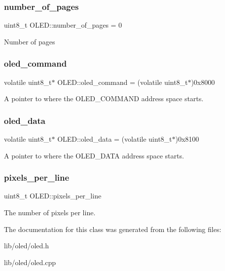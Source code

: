 \subsubsection{\texorpdfstring{number\+\_\+of\+\_\+pages}{number\_of\_pages}}
{\footnotesize\ttfamily uint8\+\_\+t O\+L\+E\+D\+::number\+\_\+of\+\_\+pages = 0\hspace{0.3cm}{\ttfamily [protected]}}

Number of pages \hypertarget{class_o_l_e_d_af0a85ccd0274347b8c1ac77d298a14cf}{}\label{class_o_l_e_d_af0a85ccd0274347b8c1ac77d298a14cf} 
\subsubsection{\texorpdfstring{oled\+\_\+command}{oled\_command}}
{\footnotesize\ttfamily volatile uint8\+\_\+t$\ast$ O\+L\+E\+D\+::oled\+\_\+command = (volatile uint8\+\_\+t$\ast$)0x8000\hspace{0.3cm}{\ttfamily [protected]}}

A pointer to where the O\+L\+E\+D\+\_\+\+C\+O\+M\+M\+A\+ND address space starts. \hypertarget{class_o_l_e_d_a1bc54d49808f92ddfc354511b692df6f}{}\label{class_o_l_e_d_a1bc54d49808f92ddfc354511b692df6f} 
\subsubsection{\texorpdfstring{oled\+\_\+data}{oled\_data}}
{\footnotesize\ttfamily volatile uint8\+\_\+t$\ast$ O\+L\+E\+D\+::oled\+\_\+data = (volatile uint8\+\_\+t$\ast$)0x8100\hspace{0.3cm}{\ttfamily [protected]}}

A pointer to where the O\+L\+E\+D\+\_\+\+D\+A\+TA address space starts. \hypertarget{class_o_l_e_d_a6ddac7b826eccac8c682c5246ef52b29}{}\label{class_o_l_e_d_a6ddac7b826eccac8c682c5246ef52b29} 
\subsubsection{\texorpdfstring{pixels\+\_\+per\+\_\+line}{pixels\_per\_line}}
{\footnotesize\ttfamily uint8\+\_\+t O\+L\+E\+D\+::pixels\+\_\+per\+\_\+line\hspace{0.3cm}{\ttfamily [protected]}}

The number of pixels per line. 

The documentation for this class was generated from the following files\+:\begin{DoxyCompactItemize}
\item 
lib/oled/oled.\+h\item 
lib/oled/oled.\+cpp\end{DoxyCompactItemize}
